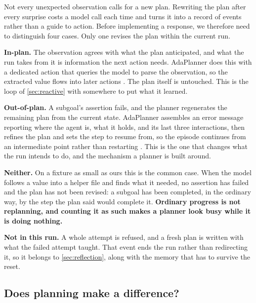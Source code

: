Not every unexpected observation calls for a new plan. Rewriting the plan after every surprise
costs a model call each time and turns it into a record of events rather than a guide to action.
Before implementing a response, we therefore need to distinguish four cases. Only one revises
the plan within the current run.

\bi

\item \textbf{In-plan.} The observation agrees with what the plan anticipated, and what the run
takes from it is information the next action needs. AdaPlanner does this with a dedicated action
that queries the model to parse the observation, so the extracted value flows into later actions
\citep[\S3.2]{sun2023adaplanner}. The plan itself is untouched. This is the loop of
\cref{sec:reactive} with somewhere to put what it learned.

\item \textbf{Out-of-plan.} A subgoal's assertion fails, and the planner regenerates the remaining
plan from the current state. AdaPlanner assembles an error message reporting where the agent is,
what it holds, and its last three interactions, then refines the plan and sets the step to resume
from, so the episode continues from an intermediate point rather than restarting
\citep[\S3.2]{sun2023adaplanner}. This is the one that changes what the run intends to do, and the
mechanism a planner is built around.

\item \textbf{Neither.} On a fixture as small as ours this is the common case. When the model
follows a value into a helper file and finds what it needed, no assertion has failed and the plan
has not been revised: a subgoal has been completed, in the ordinary way, by the step the plan said
would complete it. \textbf{Ordinary progress is not replanning, and counting it as such makes a
planner look busy while it is doing nothing.}

\item \textbf{Not in this run.} A whole attempt is refused, and a fresh plan is written with what
the failed attempt taught. That event ends the run rather than redirecting it, so it belongs to
\cref{sec:reflection}, along with the memory that has to survive the reset.

\ei


\subsection{Does planning make a difference?}
\label{sec:planning-evidence}

